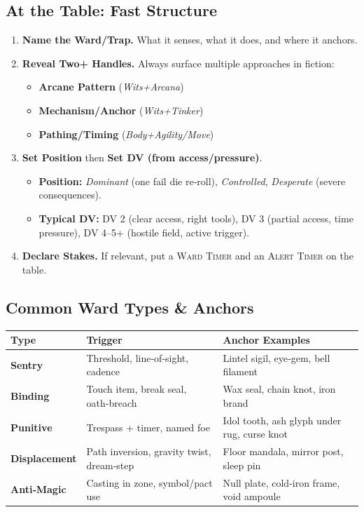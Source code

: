 \subsection*{At the Table: Fast Structure}
\begin{enumerate}[label=\textbf{Step~\arabic*:}, leftmargin=2.1em]
    \item \textbf{Name the Ward/Trap.} What it senses, what it does, and where it anchors.
    \item \textbf{Reveal Two+ Handles.} Always surface multiple approaches in fiction:
        \begin{itemize}
            \item \textbf{Arcane Pattern} (\emph{Wits+Arcana})
            \item \textbf{Mechanism/Anchor} (\emph{Wits+Tinker})
            \item \textbf{Pathing/Timing} (\emph{Body+Agility/Move})
        \end{itemize}
    \item \textbf{Set Position} then \textbf{Set DV (from access/pressure)}.
        \begin{itemize}
            \item \textbf{Position:} \emph{Dominant} (one fail die re‑roll), \emph{Controlled}, \emph{Desperate} (severe consequences).
            \item \textbf{Typical DV:} DV 2 (clear access, right tools), DV 3 (partial access, time pressure), DV 4--5+ (hostile field, active trigger).
        \end{itemize}
    \item \textbf{Declare Stakes.} If relevant, put a \textsc{Ward Timer } and an \textsc{Alert Timer } on the table.
\end{enumerate}

\subsection*{Common Ward Types \& Anchors}
\begin{tabularx}{\linewidth}{>{\bfseries}l X X}
\toprule
Type & Trigger & Anchor Examples \\
\midrule
Sentry & Threshold, line‑of‑sight, cadence & Lintel sigil, eye‑gem, bell filament \\
Binding & Touch item, break seal, oath‑breach & Wax seal, chain knot, iron brand \\
Punitive & Trespass + timer, named foe & Idol tooth, ash glyph under rug, curse knot \\
Displacement & Path inversion, gravity twist, dream‑step & Floor mandala, mirror post, sleep pin \\
Anti‑Magic & Casting in zone, symbol/pact use & Null plate, cold‑iron frame, void ampoule \\
\bottomrule
\end{tabularx}

